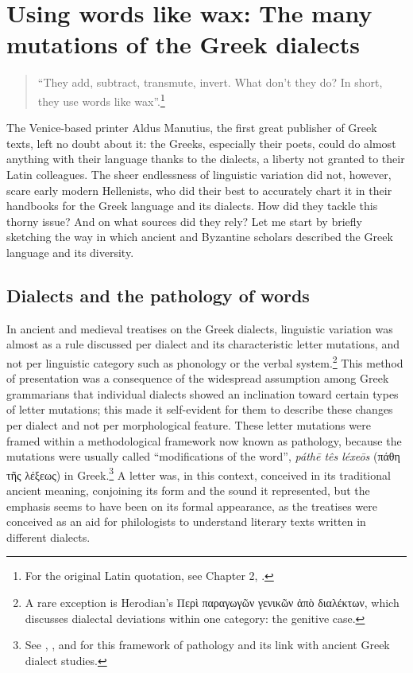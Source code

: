 \chapter{Using words like wax: The many mutations of the Greek dialects}\label{chap:6}

\begin{quote}
“They add, subtract, transmute, invert. What don’t they do? In short, they use words like wax”.\footnote{{For the original Latin quotation, see Chapter 2, .}} 
\end{quote}

The Venice-based printer Aldus Manutius, the first great publisher of Greek texts, left no doubt about it: the Greeks, especially their poets, could do almost anything with their language thanks to the dialects, a liberty not granted to their Latin colleagues. The sheer endlessness of linguistic variation did not, however, scare early modern Hellenists, who did their best to accurately chart it in their handbooks for the Greek language and its dialects. How did they tackle this thorny issue? And on what sources did they rely? Let me start by briefly sketching the way in which ancient and Byzantine scholars described the Greek language and its diversity.

\section{Dialects and the pathology of words}\label{sec:6.1}

In ancient and medieval treatises on the Greek dialects, linguistic variation was almost as a rule discussed per dialect and its characteristic letter mutations, and not per linguistic category such as phonology or the verbal system.\footnote{{A rare exception is Herodian’s Περὶ παραγωγῶν γενικῶν ἀπὸ διαλέκτων, which discusses dialectal deviations within one category: the genitive case.}} This method of presentation was a consequence of the widespread assumption among Greek grammarians that individual dialects showed an inclination toward certain types of letter mutations; this made it self-evident for them to describe these changes per dialect and not per morphological feature. These letter mutations were framed within a methodological framework now known as pathology, because the mutations were usually called “modifications of the word”, \textit{páthē tês léxeōs} (πάθη τῆς λέξεως) in Greek.\footnote{{See \citet{Wackernagel1876}, \citet[150]{Siebenborn1976}, and \citet[esp. 118]{Lallot1995} for this framework of pathology and its link with ancient Greek dialect studies.}} A letter was, in this context, conceived in its traditional ancient meaning, conjoining its form and the sound it represented, but the emphasis seems to have been on its formal appearance, as the treatises were conceived as an aid for philologists to understand literary texts written in different dialects. 


